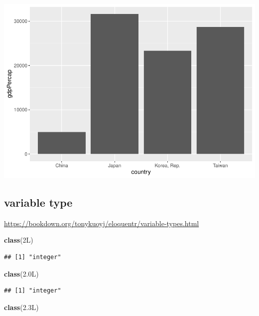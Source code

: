 \documentclass[
]{book}
\newenvironment{Shaded}{\begin{snugshade}}{\end{snugshade}}
\newcommand{\FloatTok}[1]{\textcolor[rgb]{0.00,0.00,0.81}{#1}}
\newcommand{\FunctionTok}[1]{\textcolor[rgb]{0.13,0.29,0.53}{\textbf{#1}}}
\newcommand{\NormalTok}[1]{#1}
\theoremstyle{definition}
\theoremstyle{definition}
\theoremstyle{definition}
\theoremstyle{definition}
\theoremstyle{remark}
\begin{document}
\includegraphics{202402211401-R_files/figure-latex/unnamed-chunk-23-1.pdf}

\hypertarget{variable-type}{%
\subsection{variable type}\label{variable-type}}

\url{https://bookdown.org/tonykuoyj/eloquentr/variable-types.html}

\begin{Shaded}
\begin{Highlighting}[]
\FunctionTok{class}\NormalTok{(2L)}
\end{Highlighting}
\end{Shaded}

\begin{verbatim}
## [1] "integer"
\end{verbatim}

\begin{Shaded}
\begin{Highlighting}[]
\FunctionTok{class}\NormalTok{(}\FloatTok{2.0}\NormalTok{L)}
\end{Highlighting}
\end{Shaded}

\begin{verbatim}
## [1] "integer"
\end{verbatim}

\begin{Shaded}
\begin{Highlighting}[]
\FunctionTok{class}\NormalTok{(}\FloatTok{2.3}\NormalTok{L)}
\end{Highlighting}
\end{Shaded}
\end{document}
